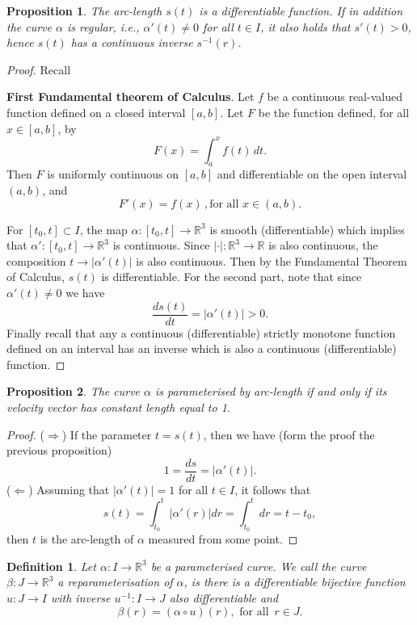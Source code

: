 \documentclass{amsart}
\newtheorem{prop}{Proposition}
\newtheorem{mydef}{Definition}
\begin{document}
\begin{prop}
The arc-length \(s(t)\) is a differentiable function. If in addition the curve \(\alpha\) is regular, i.e., \(\alpha'(t) \neq 0\) for all \(t \in I\), it also holds that \(s'(t) >0\), hence \(s(t)\) has a continuous inverse \(s^{-1}(r)\).
\end{prop}
\begin{proof}
Recall

\textbf{First Fundamental theorem of Calculus}. Let \(f\) be a continuous real-valued function defined on a closed interval \([a, b]\). Let \(F\) be the function defined, for all \(x \in [a, b]\), by
\[    F(x)=\int _{a}^{x}\!f(t)\,dt.\]
Then \(F\) is uniformly continuous on \([a, b]\) and differentiable on the open interval \((a, b)\), and
\[ F'(x)=f(x)\,, \mbox{for all } x \in (a, b). \]

For \([t_0,t]\subset I\), the map \(\alpha: [t_0,t] \to \mathbb{R}^3\) is smooth (differentiable) which implies that  \(\alpha': [t_0,t] \to \mathbb{R}^3\) is continuous.  Since \(|\cdot|:\mathbb{R}^3 \to \mathbb{R}\) is also continuous,  the composition \(t \to |\alpha'(t)|\) is also continuous. Then by the Fundamental Theorem of Calculus, \(s(t)\) is differentiable.
For the second part, note that since \(\alpha'(t) \neq 0\) we have
\[ \frac{ds(t)}{dt} = |\alpha'(t)| >0 .\]
Finally recall that any a continuous (differentiable) strictly monotone function defined on an interval has an inverse which is also a continuous (differentiable) function.
\end{proof}

\begin{prop}
The curve \(\alpha\) is parameterised by arc-length if and only if its velocity vector has constant length equal to 1.
\end{prop}
\begin{proof}
(\(\Rightarrow\)) If the parameter \(t = s(t)\), then we have (form the proof the previous proposition)
\[ 1 = \frac{ds}{dt} = |\alpha'(t)|. \]
(\(\Leftarrow\)) Assuming that \(|\alpha'(t)| =1\) for all \(t \in I\), it follows that
\[ s(t) = \int_{t_0}^{t}|\alpha'(r)|dr = \int_{t_0}^{t}dr = t - t_0,\]
then \(t\) is the arc-length of \(\alpha\) measured from some point.
\end{proof}

\begin{mydef}
Let \(\alpha : I \to  \mathbb{R}^3\) be a parameterised curve. We call the curve \(\beta : J \to \mathbb{R}^3\) a reparameterisation of \(\alpha\), is there is
a differentiable bijective function \(u: J\to I\) with inverse \(u^{-1}:I\to J\) also differentiable and 
\[ \beta (r) = (\alpha \circ u) (r), \mbox{ for all }\, r\in J. \]
\end{mydef}
\end{document}
